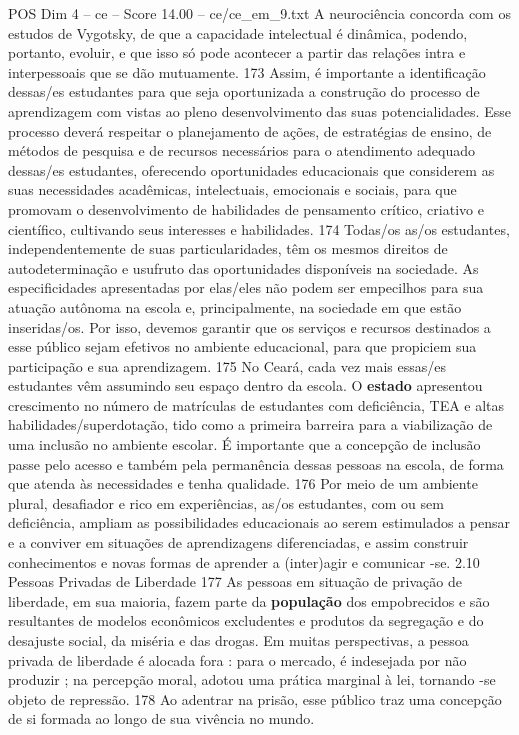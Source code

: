 \begin{textsample}{POS Dim 4 – ce – Score 14.00 – ce/ce\_em\_9.txt}
A neurociência concorda com os estudos de Vygotsky, de que a capacidade intelectual é dinâmica, podendo, portanto, evoluir, e que isso só pode acontecer a partir das relações intra e interpessoais que se dão mutuamente. 173 Assim, é importante a identificação dessas/es estudantes para que seja oportunizada a construção do processo de aprendizagem com vistas ao pleno desenvolvimento das suas potencialidades.
Esse processo deverá respeitar o planejamento de ações, de estratégias de ensino, de métodos de pesquisa e de recursos necessários para o atendimento adequado dessas/es estudantes, oferecendo oportunidades educacionais que considerem as suas necessidades acadêmicas, intelectuais, emocionais e sociais, para que promovam o desenvolvimento de habilidades de pensamento crítico, criativo e científico, cultivando seus interesses e habilidades. 174 Todas/os as/os estudantes, independentemente de suas particularidades, têm os mesmos direitos de autodeterminação e usufruto das oportunidades disponíveis na sociedade.
As especificidades apresentadas por elas/eles não podem ser empecilhos para sua atuação autônoma na escola e, principalmente, na sociedade em que estão inseridas/os.
Por isso, devemos garantir que os serviços e recursos destinados a esse público sejam efetivos no ambiente educacional, para que propiciem sua participação e sua aprendizagem. 175 No Ceará, cada vez mais essas/es estudantes vêm assumindo seu espaço dentro da escola.
O \textbf{estado} apresentou crescimento no número de matrículas de estudantes com deficiência, TEA e altas habilidades/superdotação, tido como a primeira barreira para a viabilização de uma inclusão no ambiente escolar.
É importante que a concepção de inclusão passe pelo acesso e também pela permanência dessas pessoas na escola, de forma que atenda às necessidades e tenha qualidade. 176 Por meio de um ambiente plural, desafiador e rico em experiências, as/os estudantes, com ou sem deficiência, ampliam as possibilidades educacionais ao serem estimulados a pensar e a conviver em situações de aprendizagens diferenciadas, e assim construir conhecimentos e novas formas de aprender a (inter)agir e comunicar -se. 2.10 Pessoas Privadas de Liberdade 177 As pessoas em situação de privação de liberdade, em sua maioria, fazem parte da \textbf{população} dos empobrecidos e são resultantes de modelos econômicos excludentes e produtos da segregação e do desajuste social, da miséria e das drogas.
Em muitas perspectivas, a pessoa privada de liberdade é alocada fora : para o mercado, é indesejada por não produzir ; na percepção moral, adotou uma prática marginal à lei, tornando -se objeto de repressão. 178 Ao adentrar na prisão, esse público traz uma concepção de si formada ao longo de sua vivência no mundo.

\end{textsample}
